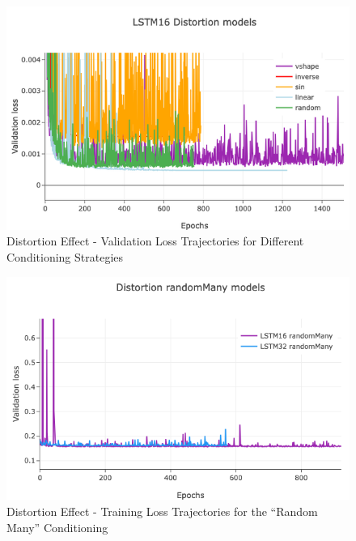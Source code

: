 \documentclass{article}
\newcommand{\quotes}[1]{``#1''}
\begin{document}
\begin{sloppy}
\begin{figure}[t]
  \centering
  \centerline{\includegraphics[width=\columnwidth]{./plots/trimmedImgs/dists valLoss.png}}
  \caption{Distortion Effect - Validation Loss Trajectories for Different Conditioning Strategies}
  \label{fig:distsVal}
\end{figure}

\begin{figure}[t]
  \centering
  \centerline{\includegraphics[width=\columnwidth]{./plots/trimmedImgs/randomMany dist trainLoss.png}}
  \caption{Distortion Effect - Training Loss Trajectories for the \quotes{Random Many} Conditioning}
  \label{fig:randomManyTrain}
\end{figure}


\end{sloppy}
\end{document}
